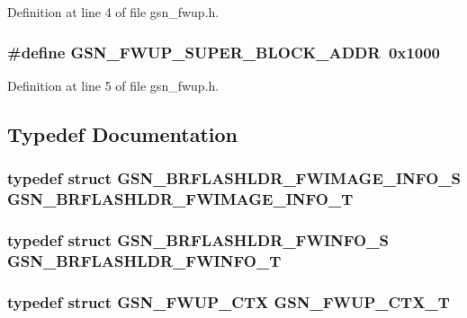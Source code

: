 Definition at line 4 of file gsn\_\-fwup.h.

\hypertarget{a00502_ac37eaa934c8636067a9233db69544c3a}{
\subsubsection[{GSN\_\-FWUP\_\-SUPER\_\-BLOCK\_\-ADDR}]{\setlength{\rightskip}{0pt plus 5cm}\#define GSN\_\-FWUP\_\-SUPER\_\-BLOCK\_\-ADDR~0x1000}}
\label{a00502_ac37eaa934c8636067a9233db69544c3a}


Definition at line 5 of file gsn\_\-fwup.h.



\subsection{Typedef Documentation}
\hypertarget{a00502_a0c04110695a757c3845195aba8691580}{
\subsubsection[{GSN\_\-BRFLASHLDR\_\-FWIMAGE\_\-INFO\_\-T}]{\setlength{\rightskip}{0pt plus 5cm}typedef struct {\bf GSN\_\-BRFLASHLDR\_\-FWIMAGE\_\-INFO\_\-S}  {\bf GSN\_\-BRFLASHLDR\_\-FWIMAGE\_\-INFO\_\-T}}}
\label{a00502_a0c04110695a757c3845195aba8691580}
\hypertarget{a00502_abcfb658142929ca326b2ff69b51d15ce}{
\subsubsection[{GSN\_\-BRFLASHLDR\_\-FWINFO\_\-T}]{\setlength{\rightskip}{0pt plus 5cm}typedef struct {\bf GSN\_\-BRFLASHLDR\_\-FWINFO\_\-S}  {\bf GSN\_\-BRFLASHLDR\_\-FWINFO\_\-T}}}
\label{a00502_abcfb658142929ca326b2ff69b51d15ce}
\hypertarget{a00502_a93955cb93de548cf3b34832dc4c40f6e}{
\subsubsection[{GSN\_\-FWUP\_\-CTX\_\-T}]{\setlength{\rightskip}{0pt plus 5cm}typedef struct {\bf GSN\_\-FWUP\_\-CTX} {\bf GSN\_\-FWUP\_\-CTX\_\-T}}}
\label{a00502_a93955cb93de548cf3b34832dc4c40f6e}


